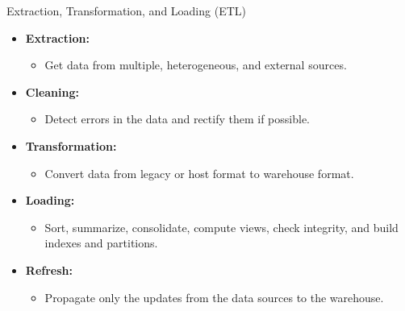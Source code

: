 \begin{frame}{Extraction, Transformation, and Loading (ETL)}
	\begin{itemize}
		\item \textbf{\color{airforceblue}Extraction:}
		      \begin{itemize}
			      \item Get data from multiple, heterogeneous, and external sources.
		      \end{itemize}
		\item \textbf{\color{airforceblue}Cleaning:}
		      \begin{itemize}
			      \item Detect errors in the data and rectify them if possible.
		      \end{itemize}
		\item \textbf{\color{airforceblue}Transformation:}
		      \begin{itemize}
			      \item Convert data from legacy or host format to warehouse format.
		      \end{itemize}
		\item \textbf{\color{airforceblue}Loading:}
		      \begin{itemize}
			      \item Sort, summarize, consolidate, compute views, check integrity, and build indexes and partitions.
		      \end{itemize}
		\item \textbf{\color{airforceblue}Refresh:}
		      \begin{itemize}
			      \item Propagate only the updates from the data sources to the warehouse.
		      \end{itemize}
	\end{itemize}
\end{frame}

